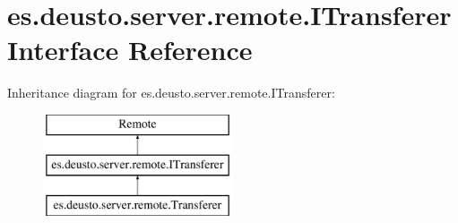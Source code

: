 \hypertarget{interfacees_1_1deusto_1_1server_1_1remote_1_1_i_transferer}{}\section{es.\+deusto.\+server.\+remote.\+I\+Transferer Interface Reference}
\label{interfacees_1_1deusto_1_1server_1_1remote_1_1_i_transferer}
Inheritance diagram for es.\+deusto.\+server.\+remote.\+I\+Transferer\+:\begin{figure}[H]
\begin{center}
\leavevmode
\includegraphics[height=3.000000cm]{interfacees_1_1deusto_1_1server_1_1remote_1_1_i_transferer}
\end{center}
\end{figure}
